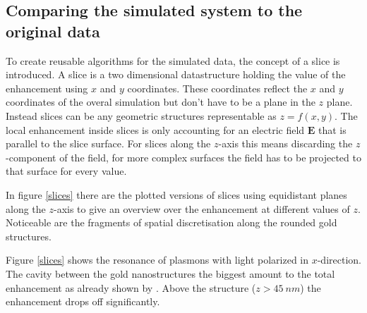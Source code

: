 \subsection{Comparing the simulated system to the original data}

To create reusable algorithms for the simulated data, the concept of a slice is introduced. A slice is a two dimensional datastructure holding the value of the enhancement using $x$ and $y$ coordinates. These coordinates reflect the $x$ and $y$ coordinates of the overal simulation but don't have to be a plane in the $z$ plane. Instead slices can be any geometric structures representable as $z=f(x,y)$. The local enhancement inside slices is only accounting for an electric field $\mathbf{E}$ that is parallel to the slice surface. For slices along the $z$-axis this means discarding the $z$-component of the field, for more complex surfaces the field has to be projected to that surface for every value.

In figure \ref{slices} there are the plotted versions of slices using equidistant planes along the $z$-axis to give an overview over the enhancement at different values of $z$. Noticeable are the fragments of spatial discretisation along the rounded gold structures.

Figure \ref{slices} shows the resonance of plasmons with light polarized in $x$-direction. The cavity between the gold nanostructures the biggest amount to the total enhancement as already shown by \cite{heeg}. Above the structure ($z>\SI{45}{nm}$) the enhancement drops off significantly.

